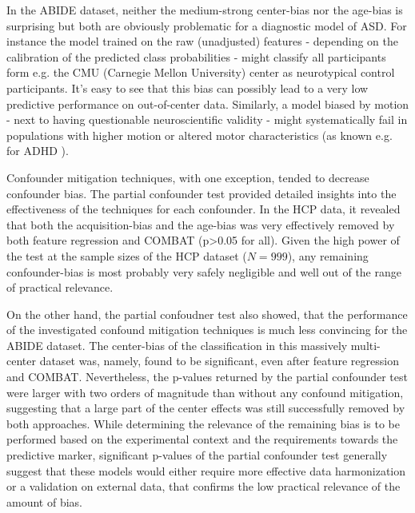\documentclass{article}
\begin{document}
In the ABIDE dataset, neither the medium-strong center-bias nor the age-bias is surprising but both are obviously problematic for a diagnostic model of ASD. For instance the model trained on the raw (unadjusted) features - depending on the calibration of the predicted class probabilities - might classify all participants form e.g. the CMU (Carnegie Mellon University) center as neurotypical control participants. It's easy to see that this bias can possibly lead to a very low predictive performance on out-of-center data. Similarly, a model biased by motion - next to having questionable neuroscientific validity - might systematically fail in populations with higher motion or altered motor characteristics (as known e.g. for ADHD \citep{eloyan2012automated}).

Confounder mitigation techniques, with one exception, tended to decrease confounder bias. The partial confounder test provided detailed insights into the effectiveness of the techniques for each confounder. In the HCP data, it revealed that both the acquisition-bias and the age-bias was very effectively removed by both feature regression and COMBAT (p>0.05 for all). Given the high power of the test at the sample sizes of the HCP dataset ($N=999$), any remaining confounder-bias is most probably very safely negligible and well out of the range of practical relevance.

On the other hand, the partial confoudner test also showed, that the performance of the investigated confound mitigation techniques is much less convincing for the ABIDE dataset. The center-bias of the classification in this massively multi-center dataset was, namely, found to be significant, even after feature regression and COMBAT. Nevertheless, the p-values returned by the partial confounder test were larger with two orders of magnitude than without any confound mitigation, suggesting that a large part of the center effects was still successfully removed by both approaches. While determining the relevance of the remaining bias is to be performed based on the experimental context and the requirements towards the predictive marker, significant p-values of the partial confounder test generally suggest that these models would either require more effective data harmonization or a validation on external data, that confirms the low practical relevance of the amount of bias.
\end{document}
